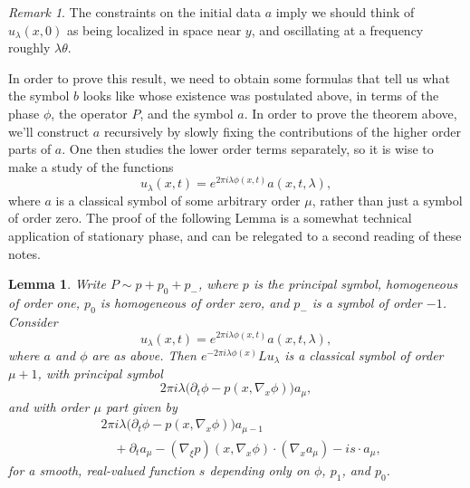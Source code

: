 \documentclass{article}
\theoremstyle{plain}
\newtheorem{lemma}[theorem]{Lemma}
\theoremstyle{remark}
\newtheorem*{remark}{Remark}
\theoremstyle{definition}
\begin{document}
\begin{remark}
	The constraints on the initial data $a$ imply we should think of $u_\lambda(x,0)$ as being localized in space near $y$, and oscillating at a frequency roughly $\lambda \theta$.
\end{remark}

In order to prove this result, we need to obtain some formulas that tell us what the symbol $b$ looks like whose existence was postulated above, in terms of the phase $\phi$, the operator $P$, and the symbol $a$. In order to prove the theorem above, we'll construct $a$ recursively by slowly fixing the contributions of the higher order parts of $a$. One then studies the lower order terms separately, so it is wise to make a study of the functions
%
\[ u_\lambda(x,t) = e^{2 \pi i \lambda \phi(x,t)} a(x,t,\lambda),\]
%
where $a$ is a classical symbol of some arbitrary order $\mu$, rather than just a symbol of order zero.
 The proof of the following Lemma is a somewhat technical application of stationary phase, and can be relegated to a second reading of these notes.

\begin{lemma}
	Write $P \sim p + p_0 + p_-$, where $p$ is the principal symbol, homogeneous of order one, $p_0$ is homogeneous of order zero, and $p_-$ is a symbol of order $-1$. Consider
	\[ u_\lambda(x,t) = e^{2 \pi i \lambda \phi(x,t)} a(x,t,\lambda), \]
	where $a$ and $\phi$ are as above. Then $e^{-2 \pi i \lambda \phi(x)} L u_\lambda$ is a classical symbol of order $\mu+1$, with principal symbol
	\[ 2\pi i \lambda \Big( \partial_t \phi - p \left( x, \nabla_x \phi \right) \Big) a_\mu, \]
	and with order $\mu$ part given by
	\begin{align*}
		&2 \pi i \lambda \Big( \partial_t \phi - p \left( x, \nabla_x \phi \right) \Big) a_{\mu - 1}\\
		&\quad + \partial_t a_\mu -  (\nabla_\xi p)(x, \nabla_x \phi) \cdot (\nabla_x a_\mu) - i s \cdot a_\mu,
	\end{align*}
	for a smooth, real-valued function $s$ depending only on $\phi$, $p_1$, and $p_0$.
\end{lemma}
\end{document}
